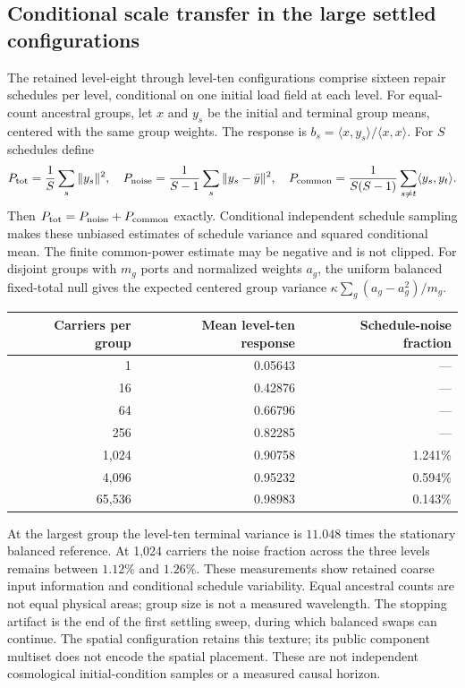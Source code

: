 \subsection{Conditional scale transfer in the large settled configurations}
\label{subsec:native-terminal-scale-transfer}
The retained level-eight through level-ten configurations comprise sixteen
repair schedules per level, conditional on one initial load field at each
level. For equal-count ancestral groups, let \(x\) and \(y_s\) be the
initial and terminal group means, centered with the same group weights.
The response is \(b_s=\langle x,y_s\rangle/\langle x,x\rangle\).
For \(S\) schedules define
\[
 P_{\rm tot}=\frac1S\sum_s\|y_s\|^2,\quad
 P_{\rm noise}=\frac1{S-1}\sum_s\|y_s-\bar y\|^2,\quad
 P_{\rm common}=\frac1{S(S-1)}\sum_{s\ne t}\langle y_s,y_t\rangle.
\]
Then \(P_{\rm tot}=P_{\rm noise}+P_{\rm common}\) exactly.
Conditional independent schedule sampling makes these unbiased estimates
of schedule variance and squared conditional mean. The finite common-power
estimate may be negative and is not clipped. For disjoint groups with
\(m_g\) ports and normalized weights \(a_g\), the uniform balanced
fixed-total null gives the expected centered group variance
\(\kappa\sum_g(a_g-a_g^2)/m_g\).

\begin{center}
\begin{tabular}{r rr}
\hline
Carriers per group & Mean level-ten response & Schedule-noise fraction\\
\hline
1 & 0.05643 & ---\\
16 & 0.42876 & ---\\
64 & 0.66796 & ---\\
256 & 0.82285 & ---\\
1,024 & 0.90758 & 1.241\%\\
4,096 & 0.95232 & 0.594\%\\
65,536 & 0.98983 & 0.143\%\\
\hline
\end{tabular}
\end{center}
At the largest group the level-ten terminal variance is \(11.048\) times
the stationary balanced reference. At 1,024 carriers the noise fraction
across the three levels remains between \(1.12\%\) and \(1.26\%\).
These measurements show retained coarse input information and conditional
schedule variability. Equal ancestral counts are not equal physical areas;
group size is not a measured wavelength. The stopping artifact is the end
of the first settling sweep, during which balanced swaps can continue.
The spatial configuration retains this texture; its public component
multiset does not encode the spatial placement. These are not independent
cosmological initial-condition samples or a measured causal horizon.


